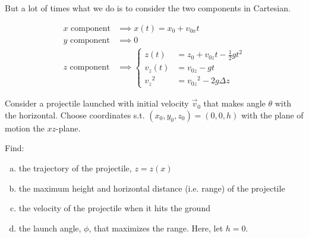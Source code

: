 But a lot of times what we do is to consider the two components in Cartesian.

\begin{align}
	\text{$x$ component} &\implies x(t) = x_0 + v_{0x}t\\
	\text{$y$ component} &\implies 0\\
	\text{$z$ component} &\implies \begin{cases}
		z(t) &= z_0 + v_{0z} t - \frac{1}{2}gt^2\\
		v_z(t) &= v_{0z} - gt\\
		{v_z}^2 &= {v_{0z}}^2 - 2g\Delta z
	\end{cases}
\end{align}

\begin{example}
	Consider a projectile launched with initial velocity $\vec v_0$ that makes angle $\theta$ with the horizontal. Choose coordinates s.t. $(x_0, y_0, z_0) = (0,0,h)$ with the plane of motion the $xz$-plane.

	Find:
	\begin{enumerate}[a)]
		\item the trajectory of the projectile, $z = z(x)$
		\item the maximum height and horizontal distance (i.e. range) of the projectile
		\item the velocity of the projectile when it hits the ground
		\item the launch angle, $\phi$, that maximizes the range. Here, let $h = 0$.
	\end{enumerate}
\end{example}

